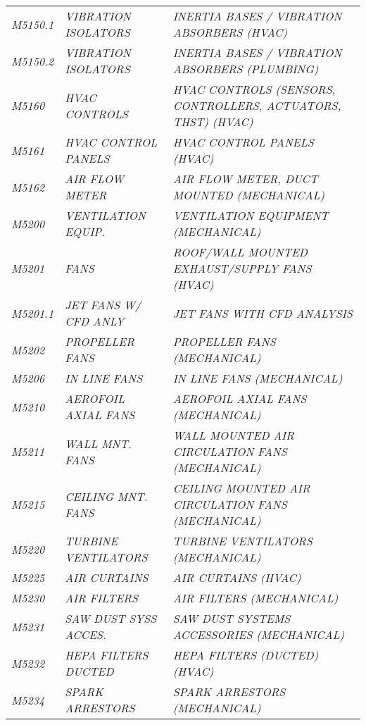 \begin{landscape}
\begin{longtable}[l]{l%
                  l|%
                  l|}
\itshape M5150.1     &\itshape VIBRATION ISOLATORS   &\itshape INERTIA BASES / VIBRATION ABSORBERS (HVAC)   \\
\itshape M5150.2     &\itshape VIBRATION ISOLATORS   &\itshape INERTIA BASES / VIBRATION ABSORBERS (PLUMBING)   \\
\itshape M5160       &\itshape HVAC CONTROLS   &\itshape HVAC CONTROLS (SENSORS, CONTROLLERS, ACTUATORS, THST) (HVAC)   \\
\itshape M5161       &\itshape HVAC CONTROL PANELS   &\itshape HVAC CONTROL PANELS (HVAC)   \\
\itshape M5162       &\itshape AIR FLOW METER   &\itshape AIR FLOW METER, DUCT MOUNTED (MECHANICAL)   \\
\itshape M5200       &\itshape VENTILATION EQUIP.   &\itshape VENTILATION EQUIPMENT (MECHANICAL)   \\
\itshape M5201       &\itshape FANS   &\itshape ROOF/WALL MOUNTED EXHAUST/SUPPLY FANS (HVAC)   \\
\itshape M5201.1     &\itshape JET FANS W/ CFD ANLY   &\itshape JET FANS WITH CFD ANALYSIS   \\
\itshape M5202       &\itshape PROPELLER FANS   &\itshape PROPELLER FANS (MECHANICAL)   \\
\itshape M5206       &\itshape IN LINE FANS   &\itshape IN LINE FANS (MECHANICAL)   \\
\itshape M5210       &\itshape AEROFOIL AXIAL FANS   &\itshape AEROFOIL AXIAL FANS (MECHANICAL)   \\
\itshape M5211       &\itshape WALL MNT. FANS   &\itshape WALL MOUNTED AIR CIRCULATION FANS (MECHANICAL)   \\
\itshape M5215       &\itshape CEILING MNT. FANS   &\itshape CEILING MOUNTED AIR CIRCULATION FANS (MECHANICAL)   \\
\itshape M5220       &\itshape TURBINE VENTILATORS   &\itshape TURBINE VENTILATORS (MECHANICAL)   \\
\itshape M5225       &\itshape AIR CURTAINS   &\itshape AIR CURTAINS (HVAC)   \\
\itshape M5230       &\itshape AIR FILTERS   &\itshape AIR FILTERS (MECHANICAL)   \\
\itshape M5231       &\itshape SAW DUST SYSS ACCES.   &\itshape SAW DUST SYSTEMS ACCESSORIES (MECHANICAL)   \\
\itshape M5232       &\itshape HEPA FILTERS DUCTED   &\itshape HEPA FILTERS (DUCTED) (HVAC)   \\
\itshape M5234       &\itshape SPARK ARRESTORS   &\itshape SPARK ARRESTORS (MECHANICAL)   \\

\end{longtable}
\end{landscape}
